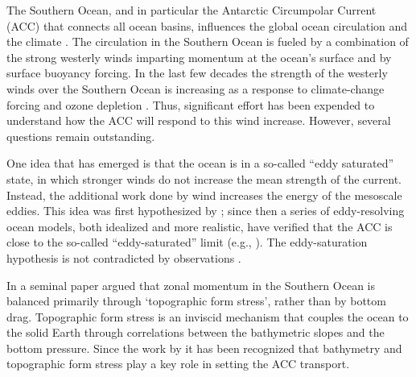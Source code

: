 \documentclass{agujournal2019}
\begin{document}
The Southern Ocean, and in particular the Antarctic Circumpolar Current (ACC) that connects all  ocean basins, influences the global ocean circulation and the climate \cite{Toggweiler-etal-2006, Talley-2013, Ferrari-etal-2014}. The circulation in the Southern Ocean is fueled by a combination of the strong westerly winds imparting momentum at the ocean's surface and by surface buoyancy forcing. In the last few decades the strength of the westerly winds over the Southern Ocean is increasing as a response to climate-change forcing and ozone depletion \cite{Marshall-2003,Swart-Fyfe-2012,Bracegirdle-etal-2013,Farneti-etal-2015}. Thus, significant effort has been expended to understand how the ACC will respond to this wind increase. However, several questions remain outstanding.


One idea that has emerged is that the ocean is in a so-called ``eddy saturated'' state, in which stronger winds do not increase the mean strength of the current. {\color{black}Instead, the additional work done by wind increases the energy of the mesoscale eddies.} This idea was first hypothesized by ; since then a series of eddy-resolving ocean models, both idealized and more realistic, have verified that the ACC is close to the so-called ``eddy-saturated'' limit (e.g., ). {\color{black}The eddy-saturation hypothesis is not contradicted by observations \cite{Boning-etal-2008, Firing-etal-2011, Hogg-etal-2015}.}


In a seminal paper  argued that zonal momentum in the Southern Ocean is balanced primarily through `topographic form stress', rather than by bottom drag. Topographic form stress is an inviscid mechanism that couples the ocean to the solid Earth through correlations between the bathymetric slopes and the bottom pressure. Since the work by  it has been recognized that bathymetry and topographic form stress play a key role in setting the ACC transport. 
\end{document}
